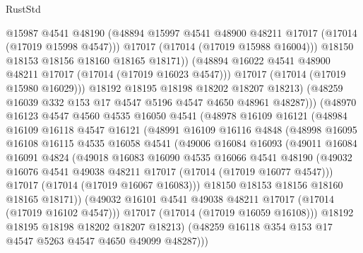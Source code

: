 \begin{lexlean}{RustStd}
\begin{coremodule}
                        @15987
                        @4541
                        @48190
                        (@48894 @15997 @4541 @48900 @48211 @17017 (@17014 (@17019 @15998 @4547)))
                        @17017
                        (@17014 (@17019 @15988 @16004)))
                      @18150
                      @18153
                      @18156
                      @18160
                      @18165
                      @18171))
                  (@48894 @16022 @4541 @48900 @48211 @17017 (@17014 (@17019 @16023 @4547)))
                  @17017
                  (@17014 (@17019 @15980 @16029)))
                @18192
                @18195
                @18198
                @18202
                @18207
                @18213)
              (@48259 @16039 @332 @153 @17 @4547 @5196 @4547 @4650 @48961 @48287)))
          (@48970
            @16123
            @4547
            @4560
            @4535
            @16050
            @4541
            (@48978
              @16109
              @16121
              (@48984
                @16109
                @16118
                @4547
                @16121
                (@48991
                  @16109
                  @16116
                  @4848
                  (@48998
                    @16095
                    @16108
                    @16115
                    @4535
                    @16058
                    @4541
                    (@49006
                      @16084
                      @16093
                      (@49011
                        @16084
                        @16091
                        @4824
                        (@49018
                          @16083
                          @16090
                          @4535
                          @16066
                          @4541
                          @48190
                          (@49032 @16076 @4541 @49038 @48211 @17017 (@17014 (@17019 @16077 @4547)))
                          @17017
                          (@17014 (@17019 @16067 @16083)))
                        @18150
                        @18153
                        @18156
                        @18160
                        @18165
                        @18171))
                    (@49032 @16101 @4541 @49038 @48211 @17017 (@17014 (@17019 @16102 @4547)))
                    @17017
                    (@17014 (@17019 @16059 @16108)))
                  @18192
                  @18195
                  @18198
                  @18202
                  @18207
                  @18213)
                (@48259 @16118 @354 @153 @17 @4547 @5263 @4547 @4650 @49099 @48287)))

\end{coremodule}
\end{lexlean}
